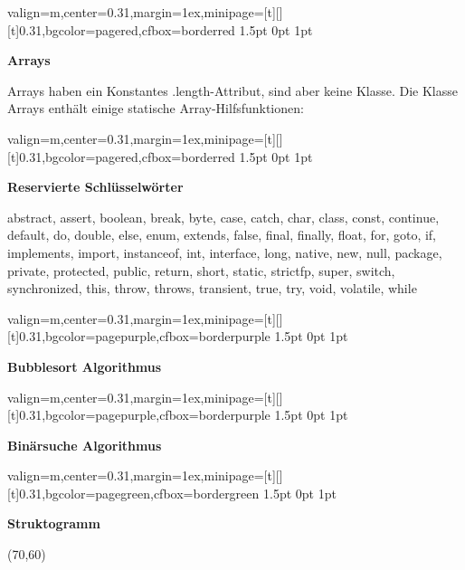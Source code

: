 \documentclass[11pt, a4paper, landscape]{article}
\newcommand{\fancyheader}[1]{
	\centerline{\sffamily \textbf{ \large #1}}
}
\newenvironment{fancybox}[2]
{
	\begin{adjustbox}{valign=m,center=0.31\textwidth,margin=1ex,minipage=[t][][t]{0.31\textwidth},bgcolor=#1,cfbox=#2 1.5pt 0pt 1pt}
	\begin{centering}
}
{
	\end{centering}
	\end{adjustbox}
}
\begin{document}
\begin{multicols}{3}
\begin{fancybox}{pagered}{borderred}
\fancyheader{Arrays}
\raggedright {
	Arrays haben ein Konstantes {\ttfamily .length}-Attribut, sind aber keine Klasse. Die Klasse {\ttfamily Arrays} enthält einige statische Array-Hilfsfunktionen:
}

\end{fancybox}

\begin{fancybox}{pagered}{borderred}
\fancyheader{Reservierte Schlüsselwörter}
{\ttfamily abstract, assert, boolean, break, byte, case, catch, char, class, const, continue, default, do, double, else, enum, extends, false, final, finally, float, for, goto, if, implements, import, instanceof, int, interface, long, native, new, null, package, private, protected, public, return, short, static, strictfp, super, switch, synchronized, this, throw, throws, transient, true, try, void, volatile, while}
\end{fancybox}

\begin{fancybox}{pagepurple}{borderpurple}
\fancyheader{Bubblesort Algorithmus}

\end{fancybox}

\begin{fancybox}{pagepurple}{borderpurple}
\fancyheader{Binärsuche Algorithmus}

\end{fancybox}

\begin{fancybox}{pagegreen}{bordergreen}
\fancyheader{Struktogramm}

\begin{struktogramm}(70,60)
			\change
		\ifend
		\change
	\ifend
\end{struktogramm}

\end{fancybox}


\end{multicols}
\end{document}

